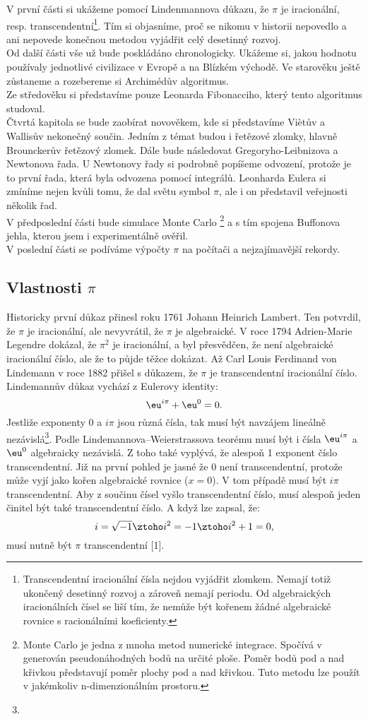 \documentclass[rocnikovka]{gzwroc} %
\begin{document}
V první části si ukážeme pomocí Lindenmannova důkazu, že $\pi$ je iracionální, resp. transcendentní\footnote[2]{Transcendentní iracionální čísla nejdou vyjádřit zlomkem. Nemají totiž ukončený desetinný rozvoj a zároveň nemají periodu. Od algebraických  iracionálních čísel se liší tím, že nemůže být kořenem žádné algebraické rovnice s racionálními koeficienty.}. Tím si objasníme, proč se nikomu v historii nepovedlo a ani nepovede konečnou metodou vyjádřit celý desetinný rozvoj.\\
Od další části vše už bude poskládáno chronologicky. Ukážeme si, jakou hodnotu používaly jednotlivé civilizace v Evropě a na Blízkém východě. Ve starověku ještě zůstaneme a rozebereme si Archimédův algoritmus.\\
Ze středověku si představíme pouze Leonarda Fibonacciho, který tento algoritmus studoval.\\
Čtvrtá kapitola se bude zaobírat novověkem, kde si představíme Viètův a Wallisův nekonečný součin. Jedním z témat budou i řetězové zlomky, hlavně Brounckerův řetězový zlomek. Dále bude následovat Gregoryho-Leibnizova a Newtonova řada. U Newtonovy řady si podrobně popíšeme odvození, protože je to první řada, která byla odvozena pomocí integrálů. Leonharda Eulera si zmíníme nejen kvůli tomu, že dal světu symbol $\pi$, ale i on představil veřejnosti několik řad.\\
V předposlední části bude simulace Monte Carlo \footnote[3]{Monte Carlo je jedna z mnoha metod numerické integrace. Spočívá v generován pseudonáhodných bodů na určité ploše. Poměr bodů pod a nad křivkou představují poměr plochy pod a nad křivkou. Tuto metodu lze použít v jakémkoliv n-dimenzionálním prostoru.} a s tím spojena Buffonova jehla, kterou jsem i experimentálně ověřil.\\
V poslední části se podíváme výpočty $\pi$ na počítači a nejzajímavější rekordy.
\subsection{Vlastnosti $\pi$}
Historicky první důkaz přinesl roku 1761 Johann Heinrich Lambert. Ten potvrdil, že $\pi$ je iracionální, ale nevyvrátil, že $\pi$ je algebraické. V roce 1794 Adrien-Marie Legendre dokázal, že $\pi^2$ je iracionální, a byl přesvědčen, že není algebraické iracionální číslo, ale že to půjde těžce dokázat. Až Carl Louis Ferdinand von Lindemann v roce 1882 přišel s důkazem, že $\pi$ je transcendentní iracionální číslo.\\
Lindemannův důkaz vychází z Eulerovy identity:
$$
\eu^{i\pi}+\eu^{0}=0.
$$
Jestliže exponenty 0 a $i\pi$ jsou různá čísla, tak musí být navzájem lineálně nezávislá\footnote[3]{}. Podle Lindemannova–Weierstrassova teorému musí být i čísla $\eu^{i\pi}$ a $\eu^{0}$ algebraicky nezávislá. Z toho také vyplývá, že alespoň 1 exponent číslo transcendentní. Již na první pohled je jasné že 0 není transcendentní, protože může vyjí jako kořen algebraické rovnice ($x=0$). V tom případě musí být $i\pi$ transcendentní. Aby z součinu čísel vyšlo transcendentní číslo, musí alespoň jeden činitel být také transcendentní číslo. A když lze zapsal, že:
$$
i=\sqrt{-1} \ztoho i^2=-1 \ztoho i^2+1=0,
$$
musí nutně být $\pi$ transcendentní [1].
\end{document}
